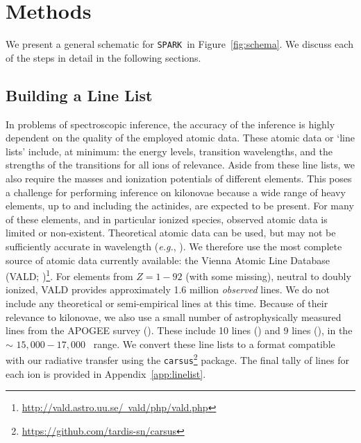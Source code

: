 \documentclass[twocolumn, twocolappendix]{aastex63}
\def\SPARK{\texttt{SPARK}}
\def\eg{{\it e.g.}}
\begin{document}

\section{Methods}\label{sec:methods}

We present a general schematic for \SPARK~in Figure~\ref{fig:schema}. We discuss each of the steps in detail in the following sections.

\subsection{Building a Line List}\label{ssc:linelist}

In problems of spectroscopic inference, the accuracy of the inference is highly dependent on the quality of the employed atomic data. These atomic data or `line lists' include, at minimum: the energy levels, transition wavelengths, and the strengths of the transitions for all ions of relevance. Aside from these line lists, we also require the masses and ionization potentials of different elements. This poses a challenge for performing inference on kilonovae because a wide range of heavy elements, up to and including the actinides, are expected to be present. For many of these elements, and in particular ionized species, observed atomic data is limited or non-existent. Theoretical atomic data can be used, but may not be sufficiently accurate in wavelength (\eg, \citealt{tanaka20}). We therefore use the most complete source of atomic data currently available: the Vienna Atomic Line Database (VALD; \citealt{ryabchikova15, pakhomov19})\footnote{{\href{http://vald.astro.uu.se/~vald/php/vald.php}{http://vald.astro.uu.se/~vald/php/vald.php}}}. For elements from $Z = 1-92$ (with some missing), neutral to doubly ionized, VALD provides approximately 1.6  million \textit{observed} lines. We do not include any theoretical or semi-empirical lines at this time. Because of their relevance to kilonovae, we also use a small number of astrophysically measured lines from the APOGEE survey (\citealt{majewski17}). These include 10  lines (\citealt{hasselquist16}) and 9  lines (\citealt{cunha17}), in the $\sim$ $15,000 - 17,000$~\text{\AA} range. We convert these line lists to a format compatible with our radiative transfer using the \texttt{carsus}\footnote{\href{https://github.com/tardis-sn/carsus}{https://github.com/tardis-sn/carsus}} package. The final tally of lines for each ion is provided in Appendix~\ref{app:linelist}.
\end{document}
